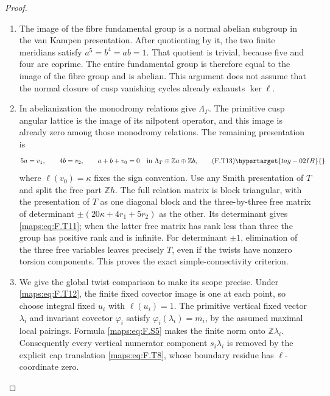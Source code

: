 \begin{proof}
\begin{enumerate}[label={$\langle1\rangle$\arabic*.}]
\item The image of the fibre fundamental group is a normal
abelian subgroup in the van Kampen presentation.
After quotienting by it, the two finite meridians satisfy
$a^5=b^4=ab=1$.
That quotient is trivial, because five and four are coprime.
The entire fundamental group is therefore equal to the
image of the fibre group and is abelian.
This argument does not assume that the normal closure of
cusp vanishing cycles already exhausts $\ker\ell$.

\item In abelianization the monodromy relations give
$\Lambda_\Gamma$.
The primitive cusp angular lattice is the image of its
nilpotent operator, and this image is already zero among
those monodromy relations.
The remaining presentation is
\[
 5a=v_1,\qquad4b=v_2,\qquad a+b+v_0=0
 \quad\text{in }\Lambda_\Gamma\oplus\mathbb Za\oplus\mathbb Zb,
 \tag{F.T13}\hypertarget{tag-02IB}{}\label{maps:eq:F.T13}
\]
where $\ell(v_0)=\kappa$ fixes the sign convention.
Use any Smith presentation of $T$ and split the free part
$\mathbb Zh$.
The full relation matrix is block triangular, with the
presentation of $T$ as one diagonal block and the
three-by-three free matrix of determinant
$\pm(20\kappa+4r_1+5r_2)$ as the other.
Its determinant gives \eqref{maps:eq:F.T11}; when the latter free
matrix has rank less than three the group has positive
rank and is infinite.
For determinant $\pm1$, elimination of the three free
variables leaves precisely $T$, even if the twists have
nonzero torsion components.
This proves the exact simple-connectivity criterion.

\item We give the global twist comparison to make its scope
precise.  Under \eqref{maps:eq:F.T12}, the finite fixed covector image
is one at each point, so choose integral fixed $u_i$ with
$\ell(u_i)=1$.  The primitive vertical fixed vector
$\lambda_i$ and invariant covector $\varphi_i$ satisfy
$\varphi_i(\lambda_i)=m_i$, by the assumed maximal local
pairings.  Formula \eqref{maps:eq:F.S5} makes the finite norm onto
$\mathbb Z\lambda_i$.
Consequently every vertical numerator component
$s_i\lambda_i$ is removed by the explicit cap translation
\eqref{maps:eq:F.T8}, whose boundary residue has $\ell$-coordinate zero.


\end{enumerate}
\end{proof}
